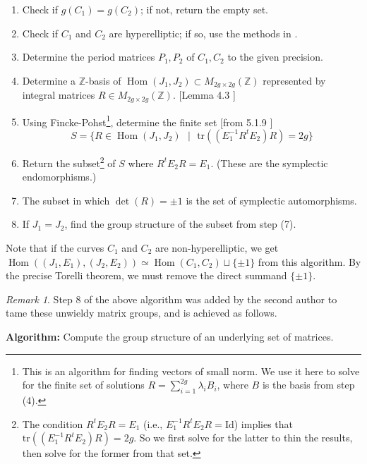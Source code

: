 \documentclass[12pt,reqno]{amsart}
\DeclareMathOperator{\Hom}{Hom}
\newcommand{\Z}{\mathbb{Z}}
\theoremstyle{definition}
\theoremstyle{remark}
\newtheorem*{remark}{Remark}
\begin{document}
\begin{enumerate}
\item Check if $g(C_1) = g(C_2)$; if not, return the empty set.
\item Check if $C_1$ and $C_2$ are hyperelliptic; if so, use the methods in \cite{hyp}.
\item Determine the period matrices $P_1, P_2$ of $C_1, C_2$ to the given precision.
\item Determine a $\Z$-basis of $\Hom(J_1, J_2) \subset M_{2g \times 2g}(\Z)$ represented by integral matrices $R \in  M_{2g \times 2g}(\Z)$. [Lemma 4.3 \cite{jeroen}]
\item Using Fincke-Pohst\footnote{This is an algorithm for finding vectors of small norm. We use it here to solve for the finite set of solutions $R = \sum_{i = 1}^{2g} \lambda_i B_i$, where $B$ is the basis from step (4).}, determine the finite set [from 5.1.9 \cite{bl}] $$S = \{ R \in \Hom(J_1, J_2) \text{ } | \text{ } \text{tr}((E_1^{-1}R^tE_2)R) = 2g\}$$
\item Return the subset\footnote{The condition $R^tE_2R = E_1$ (i.e., $E_1^{-1}R^tE_2R = \text{Id}$) implies that $\text{tr}((E_1^{-1}R^tE_2)R) = 2g$. So we first solve for the latter to thin the results, then solve for the former from that set.}  of $S$ where $R^tE_2R = E_1$. (These are the symplectic endomorphisms.)
\item The subset in which $\det(R) = \pm 1$ is the set of symplectic automorphisms.
\item If $J_1 = J_2$, find the group structure of the subset from step (7).
\end{enumerate}

\vspace{+10pt} 

Note that if the curves $C_1$ and $C_2$ are non-hyperelliptic, we get $\Hom((J_1, E_1), (J_2, E_2)) \simeq \Hom(C_1, C_2) \sqcup \{ \pm 1 \}$ from this algorithm. By the precise Torelli theorem, we must remove the direct summand $\{ \pm 1 \}$.

\begin{remark} Step 8 of the above algorithm was added by the second author to tame these unwieldy matrix groups, and is achieved as follows.\end{remark}

\textbf{Algorithm:} Compute the group structure of an underlying set of matrices.
\end{document}

